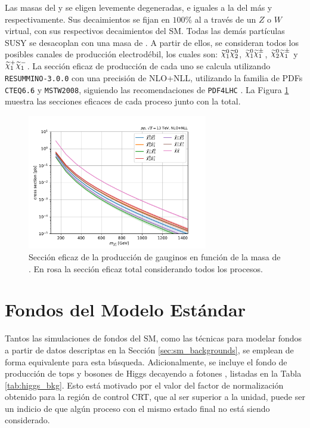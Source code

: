 Las masas del \ninotwo y \chinopm se eligen levemente degeneradas, e iguales a la del \ninoone más  y  respectivamente. 
Sus decaimientos se fijan en $100\%$ al \ninoone a través de un $Z$ o $W$ virtual, con sus respectivos decaimientos del SM. Todas las demás partículas SUSY se desacoplan con una masa de . A partir de ellos, se consideran todos los posibles canales de producción electrodébil, los cuales son: $\ninoone \ninotwo$, $\ninoone \chinoonepm$, $\ninotwo \chinoonepm$ y $\chinoonep \chinoonem$. La sección eficaz de producción de cada uno se calcula utilizando \texttt{RESUMMINO-3.0.0} \cite{Beenakker:1999xh,Debove:2010kf,Fuks:2012qx,Fuks:2013vua,Fiaschi:2018hgm} con una precisión de NLO+NLL, utilizando la familia de PDFs \texttt{CTEQ6.6} y \texttt{MSTW2008}, siguiendo las recomendaciones de \texttt{PDF4LHC} \cite{Butterworth:2015oua}. La Figura \ref{fig:SUSY_EWK_xs} muestra las secciones eficaces de cada proceso junto con la total.

\begin{figure}
  \centering
  \includegraphics[width=0.7\textwidth]{images/analysis_EWK/SUSY_EWK_xsecs_m.pdf}
  \caption{Sección eficaz de la producción de gauginos en función de la masa de \ninoone. En rosa la sección eficaz total considerando todos los procesos.}
  \label{fig:SUSY_EWK_xs}
\end{figure}



\section{Fondos del Modelo Estándar}

Tantos las simulaciones de fondos del SM, como las técnicas para modelar fondos a partir de datos descriptas en la Sección \ref{sec:sm_backgrounds}, se emplean de forma equivalente para esta búsqueda. Adicionalmente, se incluye el fondo de producción de tops y bosones de Higgs decayendo a fotones \cite{tesis_jose}, listadas en la Tabla \ref{tab:higgs_bkg}. Esto está motivado por el valor del factor de normalización obtenido para la región de control CRT, que al ser superior a la unidad, puede ser un indicio de que algún proceso con el mismo estado final no está siendo considerado.


